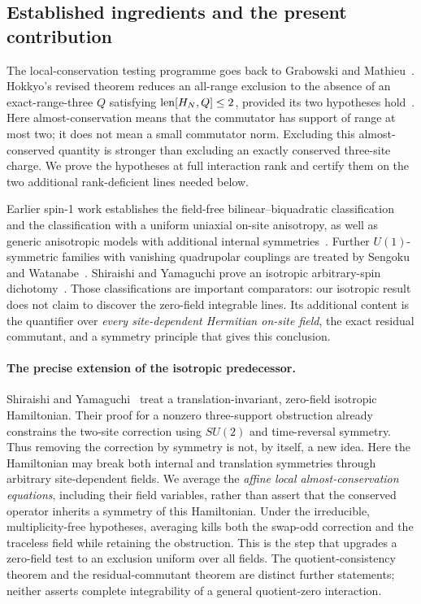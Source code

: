 \documentclass[11pt,a4paper]{article}
\numberwithin{equation}{section}
\theoremstyle{definition}\newtheorem{definition}[theorem]{Definition}
\theoremstyle{remark}\newtheorem{remark}[theorem]{Remark}
\begin{document}
\subsection{Established ingredients and the present contribution}
The local-conservation testing programme goes back to Grabowski and Mathieu~\cite{GrabowskiMathieu}. Hokkyo's revised theorem reduces an all-range exclusion to the absence of an exact-range-three $Q$ satisfying $\operatorname{len}[H_N,Q]\le2$, provided its two hypotheses hold~\cite{HokkyoTest}. Here almost-conservation means that the commutator has support of range at most two; it does not mean a small commutator norm. Excluding this almost-conserved quantity is stronger than excluding an exactly conserved three-site charge. We prove the hypotheses at full interaction rank and certify them on the two additional rank-deficient lines needed below.

Earlier spin-1 work establishes the field-free bilinear--biquadratic classification and the classification with a uniform uniaxial on-site anisotropy, as well as generic anisotropic models with additional internal symmetries~\cite{ParkLee,HSC}. Further $U(1)$-symmetric families with vanishing quadrupolar couplings are treated by Sengoku and Watanabe~\cite{SW}. Shiraishi and Yamaguchi prove an isotropic arbitrary-spin dichotomy~\cite{SY}. Those classifications are important comparators: our isotropic result does not claim to discover the zero-field integrable lines. Its additional content is the quantifier over \emph{every site-dependent Hermitian on-site field}, the exact residual commutant, and a symmetry principle that gives this conclusion.

\paragraph{The precise extension of the isotropic predecessor.}
Shiraishi and Yamaguchi~\cite{SY} treat a translation-invariant, zero-field isotropic Hamiltonian. Their proof for a nonzero three-support obstruction already constrains the two-site correction using $SU(2)$ and time-reversal symmetry. Thus removing the correction by symmetry is not, by itself, a new idea. Here the Hamiltonian may break both internal and translation symmetries through arbitrary site-dependent fields. We average the \emph{affine local almost-conservation equations}, including their field variables, rather than assert that the conserved operator inherits a symmetry of this Hamiltonian. Under the irreducible, multiplicity-free hypotheses, averaging kills both the swap-odd correction and the traceless field while retaining the obstruction. This is the step that upgrades a zero-field test to an exclusion uniform over all fields. The quotient-consistency theorem and the residual-commutant theorem are distinct further statements; neither asserts complete integrability of a general quotient-zero interaction.
\end{document}
